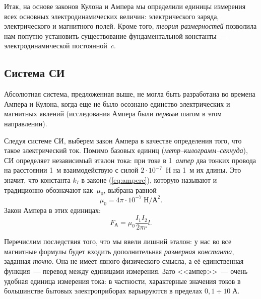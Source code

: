 Итак, на основе законов Кулона и Ампера мы определили единицы измерения
всех основных электродинамических величин: электрического заряда,
электрического и магнитного полей. Кроме того, \emph{теория размерностей}
позволила нам попутно установить существование фундаментальной константы~---
электродинамической постоянной~$c$.

\subsection*{Система СИ}

Абсолютная система, предложенная выше, не могла быть разработана во
времена Ампера и Кулона, когда еще не было осознано единство электрических
и магнитных явлений (исследования Ампера были \emph{первым} шагом
в этом направлении).

Следуя системе СИ, выберем закон Ампера в качестве определения того,
что такое электрический ток. Помимо базовых единиц (\emph{метр--килограмм--секнуда}),
СИ определяет независимый эталон тока: при токе в 1~\emph{ампер} два
тонких провода на расстоянии 1~м взаимодействую с силой $2\cdot10^{-7}$~Н
на 1~м их длины. Это значит, что константа $k_{I}$ в законе (\ref{eq:ampere}),
которую называют  и традиционно обозначают
как~$\mu_{0}$, выбрана равной
\[
\mu_{0}=4\pi\cdot10^{-7}\;\text{Н}/\text{А}^{2}.
\]
Закон Ампера в этих единицах:
\begin{equation}
F_{\text{А}}=\mu_{0}\frac{I_{1}I_{2}}{2\pi r}l.
\end{equation}

Перечислим последствия того, что мы ввели лишний эталон: у нас во
все магнитные формулы будет входить
дополнительная \emph{размерная константа}, заданная \emph{точно}.
Она не имеет явного физического смысла, а её единственная функция~---
перевод между единицами измерения. Зато <<ампер>>~--- очень удобная
единица измерения тока: в частности, характерные значения токов в
большинстве бытовых электроприборах варьируются в пределах $0{,}1\div10\;\text{А}$.

